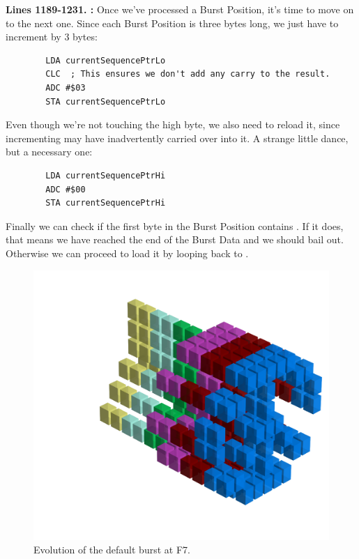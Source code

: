 \textbf{Lines 1189-1231. :} Once we've processed a Burst Position, it's time to move on to the next one. Since each Burst Position
is three bytes long, we just have to increment  by 3 bytes:
\begin{lstlisting}
        LDA currentSequencePtrLo
        CLC  ; This ensures we don't add any carry to the result.
        ADC #$03
        STA currentSequencePtrLo
\end{lstlisting}

Even though we're not touching the high byte, we also need to reload it, since incrementing  may have inadvertently carried over into it.
A strange little dance, but a necessary one:
\begin{lstlisting}
        LDA currentSequencePtrHi
        ADC #$00
        STA currentSequencePtrHi
\end{lstlisting}

Finally we can check if the first byte in the Burst Position contains . If it does, that means we have reached the end of the Burst Data and we should bail out.
Otherwise we can proceed to load it by looping back to .


\clearpage
{}
\begin{figure}[H]
    \centering
    \begin{adjustbox}{width=12cm,center}
      \includegraphics[width=12cm]{src/patterns/bursts/pattern3-45.png}%
    \end{adjustbox}
\caption{Evolution of the default burst at F7.}
\end{figure}
\clearpage

